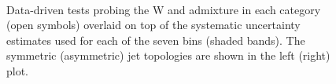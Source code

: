 \begin{figure}[h!]
  \begin{center}
    ~~
    \caption{Data-driven tests probing the W and \ttbar admixture 
      in each \njet category (open symbols) overlaid on top of the systematic
      uncertainty estimates used for each of the seven \scalht bins
      (shaded bands). 
      The symmetric (asymmetric) jet topologies are shown in the left (right) plot.      
    }
    \label{fig:closureBTag}
  \end{center} 
\end{figure}


